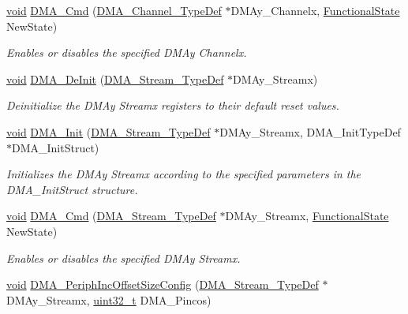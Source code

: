 \begin{DoxyCompactItemize}
\hyperlink{group___n_a_m_e_ga18028b8badbf1ea7e704ccac3c488e82}{void} \hyperlink{group___d_m_a___group1_ga8e7cb6b9ae5f142e2961df879cdaba65}{D\-M\-A\-\_\-\-Cmd} (\hyperlink{struct_d_m_a___channel___type_def}{D\-M\-A\-\_\-\-Channel\-\_\-\-Type\-Def} $\ast$D\-M\-Ay\-\_\-\-Channelx, \hyperlink{group___exported__types_gac9a7e9a35d2513ec15c3b537aaa4fba1}{Functional\-State} New\-State)
\begin{DoxyCompactList}\small\item\em Enables or disables the specified D\-M\-Ay Channelx. \end{DoxyCompactList}\item 
\hyperlink{group___n_a_m_e_ga18028b8badbf1ea7e704ccac3c488e82}{void} \hyperlink{group___d_m_a___group1_ga38d4a4ab8990299f8a6cf064e1e811d0}{D\-M\-A\-\_\-\-De\-Init} (\hyperlink{struct_d_m_a___stream___type_def}{D\-M\-A\-\_\-\-Stream\-\_\-\-Type\-Def} $\ast$D\-M\-Ay\-\_\-\-Streamx)
\begin{DoxyCompactList}\small\item\em Deinitialize the D\-M\-Ay Streamx registers to their default reset values. \end{DoxyCompactList}\item 
\hyperlink{group___n_a_m_e_ga18028b8badbf1ea7e704ccac3c488e82}{void} \hyperlink{group___d_m_a___group1_gaced8a4149acfb0a50b50e63273a87148}{D\-M\-A\-\_\-\-Init} (\hyperlink{struct_d_m_a___stream___type_def}{D\-M\-A\-\_\-\-Stream\-\_\-\-Type\-Def} $\ast$D\-M\-Ay\-\_\-\-Streamx, D\-M\-A\-\_\-\-Init\-Type\-Def $\ast$D\-M\-A\-\_\-\-Init\-Struct)
\begin{DoxyCompactList}\small\item\em Initializes the D\-M\-Ay Streamx according to the specified parameters in the D\-M\-A\-\_\-\-Init\-Struct structure. \end{DoxyCompactList}\item 
\hyperlink{group___n_a_m_e_ga18028b8badbf1ea7e704ccac3c488e82}{void} \hyperlink{group___d_m_a___group1_gab2bea22f9f6dc62fdd7afb385a0c1f73}{D\-M\-A\-\_\-\-Cmd} (\hyperlink{struct_d_m_a___stream___type_def}{D\-M\-A\-\_\-\-Stream\-\_\-\-Type\-Def} $\ast$D\-M\-Ay\-\_\-\-Streamx, \hyperlink{group___exported__types_gac9a7e9a35d2513ec15c3b537aaa4fba1}{Functional\-State} New\-State)
\begin{DoxyCompactList}\small\item\em Enables or disables the specified D\-M\-Ay Streamx. \end{DoxyCompactList}\item 
\hyperlink{group___n_a_m_e_ga18028b8badbf1ea7e704ccac3c488e82}{void} \hyperlink{group___d_m_a___group1_ga210a9861460b3c9b3fa14fdc1a949744}{D\-M\-A\-\_\-\-Periph\-Inc\-Offset\-Size\-Config} (\hyperlink{struct_d_m_a___stream___type_def}{D\-M\-A\-\_\-\-Stream\-\_\-\-Type\-Def} $\ast$D\-M\-Ay\-\_\-\-Streamx, \hyperlink{stdint_8h_a435d1572bf3f880d55459d9805097f62}{uint32\-\_\-t} D\-M\-A\-\_\-\-Pincos)

\end{DoxyCompactItemize}
